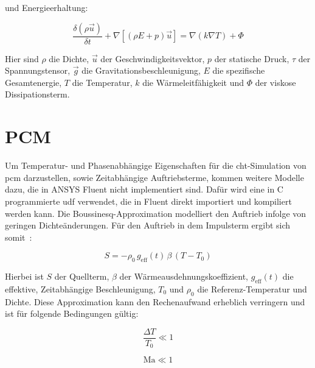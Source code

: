 und Energieerhaltung:

\begin{equation}
  \label{eq:navier_energieerhaltung}
  \frac{\delta \left(\rho \vec{u}\right)}{\delta t} + \nabla \left[\left(\rho E + p\right)\vec{u}\right] = \nabla \left(k \nabla T\right) + \Phi
\end{equation}

Hier sind $\rho$ die Dichte, $\vec{u}$ der Geschwindigkeitsvektor, $p$ der statische Druck, $\tau$ der Spannungstensor,
$\vec{g}$ die Gravitationsbeschleunigung, $E$ die spezifische Gesamtenergie, $T$ die Temperatur, $k$ die Wärmeleitfähigkeit
und $\Phi$ der viskose Dissipationsterm.

\section*{PCM}
Um Temperatur- und Phasenabhängige Eigenschaften für die \ac{cht}-Simulation von \ac{pcm} darzustellen, sowie Zeitabhängige Auftriebsterme, kommen weitere Modelle dazu,
die in ANSYS Fluent nicht implementiert sind. Dafür wird eine in C programmierte \ac{udf} verwendet, die in Fluent direkt importiert
und kompiliert werden kann.
Die Boussinesq-Approximation modelliert den Auftrieb infolge von geringen Dichteänderungen. Für den Auftrieb
in dem Impulsterm ergibt sich somit~\cite{akamcae-udf}:

\begin{equation}
  \label{eq:udf_bouss}
  S = -\rho_0 \, g_\text{eff}(t)\,\beta\,(T-T_0)
\end{equation}

Hierbei ist $S$ der Quellterm, $\beta$ der Wärmeausdehnungskoeffizient, $g_\text{eff}(t)$ die effektive, Zeitabhängige Beschleunigung,
$T_0$ und $\rho_0$ die Referenz-Temperatur und Dichte. Diese Approximation kann den Rechenaufwand erheblich verringern und ist für folgende Bedingungen gültig:

\noindent\begin{minipage}{.5\linewidth}
  \begin{equation}
    \label{eq:bossinesque_bedingung1}
    \frac{\Delta T}{T_0} \ll 1
  \end{equation}
\end{minipage}%
\begin{minipage}{.5\linewidth}
  \begin{equation}
    \label{eq:bossinesque_bedingung2}
    \text{Ma} \ll 1
  \end{equation}
\end{minipage}

